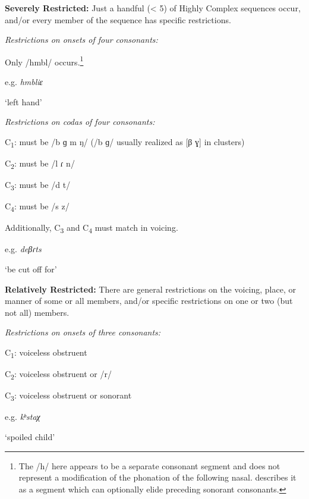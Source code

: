 \ea\label{ex:3.27}
  \textbf{Severely Restricted:} Just a handful (< 5) of Highly Complex sequences occur, and/or every member of the sequence has specific restrictions.

\ea 
{}

\textit{Restrictions on onsets of four consonants:}

Only /hmbl/ occurs.\footnote{{The /h/ here appears to be a separate consonant segment and does not represent a modification of the phonation of the following nasal. \citet[54]{Marmion2010} describes it as a segment which can optionally elide preceding sonorant consonants.}}

e.g.  \textit{hmbliɛ}

    ‘left hand’
\citep[69]{Marmion2010}

\ex
{}

\textit{Restrictions on codas of four consonants:}

C\textsubscript{1}: must be /b ɡ m ŋ/ (/b ɡ/ usually realized as [β ɣ] in clusters)

C\textsubscript{2}: must be /l ɾ n/

C\textsubscript{3}: must be /d t/

C\textsubscript{4}: must be /s z/
\z
\z

Additionally, C\textsubscript{3} and C\textsubscript{4} must match in voicing.

e.g.   \textit{deβɾts}

    ‘be cut off for’

\citep[41--42]{WieringWiering1994}

\ea\label{ex:3.28}
  \textbf{Relatively Restricted:} There are general restrictions on the voicing, place, or manner of some or all members, and/or specific restrictions on one or two (but not all) members.

\ea
{}

\textit{Restrictions on onsets of three consonants:}

C\textsubscript{1}: voiceless obstruent

C\textsubscript{2}: voiceless obstruent or /r/

C\textsubscript{3}: voiceless obstruent or sonorant

e.g.  \textit{kʰstaχ}

    ‘spoiled child’
\citep[37]{Haspelmath1993}

\ex
{}

